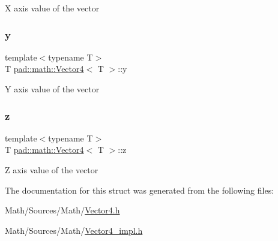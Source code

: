 X axis value of the vector \mbox{\label{structpad_1_1math_1_1_vector4_a2461711530968b1c7c5ff1256a5a6098}} 
\subsubsection{\texorpdfstring{y}{y}}
{\footnotesize\ttfamily template$<$typename T$>$ \\
T \mbox{\hyperlink{structpad_1_1math_1_1_vector4}{pad\+::math\+::\+Vector4}}$<$ T $>$\+::y}

Y axis value of the vector \mbox{\label{structpad_1_1math_1_1_vector4_a9407faaccb5b094aeb3cadc36e71755e}} 
\subsubsection{\texorpdfstring{z}{z}}
{\footnotesize\ttfamily template$<$typename T$>$ \\
T \mbox{\hyperlink{structpad_1_1math_1_1_vector4}{pad\+::math\+::\+Vector4}}$<$ T $>$\+::z}

Z axis value of the vector 

The documentation for this struct was generated from the following files\+:\begin{DoxyCompactItemize}
\item 
Math/\+Sources/\+Math/\mbox{\hyperlink{_vector4_8h}{Vector4.\+h}}\item 
Math/\+Sources/\+Math/\mbox{\hyperlink{_vector4__impl_8h}{Vector4\+\_\+impl.\+h}}\end{DoxyCompactItemize}
